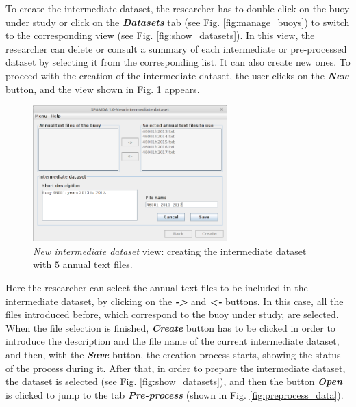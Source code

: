 \documentclass[energies,article,submit,moreauthors,pdftex]{Definitions/mdpi}
\begin{document}
			To create the intermediate dataset, the researcher has to double-click on the buoy under study or click on the \textbf{\textit{Datasets}} tab (see Fig. \ref{fig:manage_buoys}) to switch to the corresponding view (see Fig. \ref{fig:show_datasets}). In this view, the researcher can delete or consult a summary of each intermediate or pre-processed dataset by selecting it from the corresponding list. It can also create new ones. To proceed with the creation of the intermediate dataset, the user clicks on the \textbf{\textit{New}} button, and the view shown in Fig. \ref{fig:intermediate} appears. 
			
			\begin{figure}[ht!]
				\centering
				\includegraphics[width=0.67\textwidth]{figures/FigureNew_intermediate_dataset.png}
				\caption{\textit{New intermediate dataset} view: creating the intermediate dataset with $5$ annual text files.}\label{fig:intermediate}
			\end{figure}
			
			Here the researcher can select the annual text files to be included in the intermediate dataset, by clicking on the \textbf{\textit{->}} and \textbf{\textit{<-}} buttons. In this case, all the files introduced before, which correspond to the buoy under study, are selected. When the file selection is finished, \textbf{\textit{Create}} button has to be clicked in order to introduce the description and the file name of the current intermediate dataset, and then, with the \textbf{\textit{Save}} button, the creation process starts, showing the status of the process during it. After that, in order to prepare the intermediate dataset, the dataset is selected (see Fig. \ref{fig:show_datasets}), and then the button \textbf{\textit{Open}} is clicked to jump to the tab \textbf{\textit{Pre-process}} (shown in Fig. \ref{fig:preprocess_data}).
			
\end{document}
